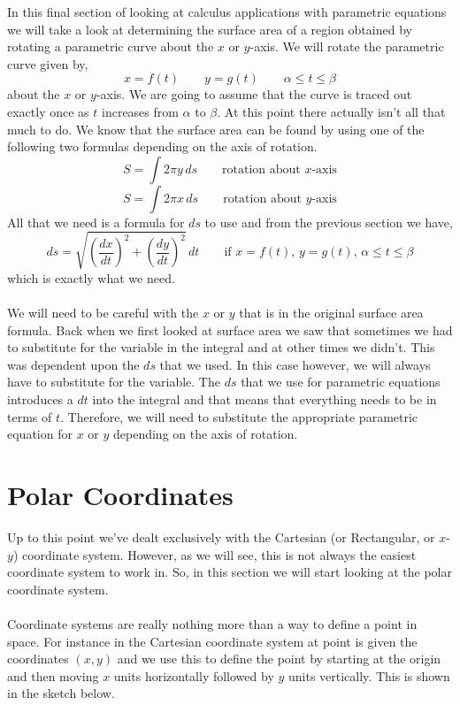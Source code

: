 \documentclass[10pt,reqno]{book}
\theoremstyle{definition}
\begin{document}
	In this final section of looking at calculus applications with parametric equations we will take a look at determining the surface area of a region obtained by rotating a parametric curve about the $ x $ or $ y $-axis. We will rotate the parametric curve given by,
	\[ x = f(t) \qquad y = g(t) \qquad \alpha \leq t \leq \beta \]
	about the $ x $ or $ y $-axis. We are going to assume that the curve is traced out exactly once as $ t $ increases from $ \alpha $ to $ \beta $. At this point there actually isn't all that much to do. We know that the surface area can be found by using one of the following two formulas depending on the axis of rotation.
	\[ S = \int 2\pi y \, ds \qquad \text{rotation about } x \text{-axis} \]
	\[ S = \int 2\pi x \, ds \qquad \text{rotation about } y \text{-axis} \]
	All that we need is a formula for $ ds $ to use and from the previous section we have,
	\[ ds = \sqrt{ \left( \dfrac{dx}{dt} \right)^2 + \left( \dfrac{dy}{dt} \right)^2 } \, dt \qquad \text{if } x = f(t),\, y= g(t),\, \alpha \leq t \leq \beta \]
	which is exactly what we need.\\ \\
	We will need to be careful with the $ x $ or $ y $ that is in the original surface area formula. Back when we first looked at surface area we saw that sometimes we had to substitute for the variable in the integral and at other times we didn't. This was dependent upon the $ ds $ that we used. In this case however, we will always have to substitute for the variable. The $ ds $ that we use for parametric equations introduces a $ dt $ into the integral and that means that everything needs to be in terms of $ t $. Therefore, we will need to substitute the appropriate parametric equation for $ x $ or $ y $ depending on the axis of rotation.
	
	\section{Polar Coordinates}
	
	Up to this point we've dealt exclusively with the Cartesian (or Rectangular, or $ x $-$ y $) coordinate system. However, as we will see, this is not always the easiest coordinate system to work in. So, in this section we will start looking at the polar coordinate system.\\ \\
	Coordinate systems are really nothing more than a way to define a point in space. For instance in the Cartesian coordinate system at point is given the coordinates $ (x,y) $ and we use this to define the point by starting at the origin and then moving $ x $ units horizontally followed by $ y $ units vertically. This is shown in the sketch below.
	
\end{document}
